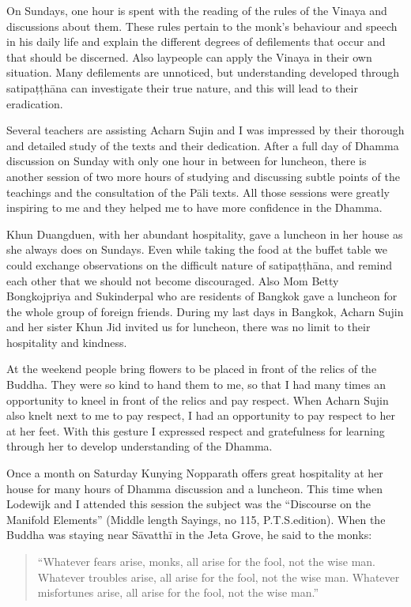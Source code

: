 On Sundays, one hour is spent with the reading of the rules of the Vinaya and discussions about them. These rules pertain to the monk’s behaviour and speech in his daily life and explain the different degrees of defilements that occur and that should be discerned. Also laypeople can apply the Vinaya in their own situation. Many defilements are unnoticed, but understanding developed through satipaṭṭhāna can investigate their true nature, and this will lead to their eradication.

Several teachers are assisting Acharn Sujin and I was impressed by their thorough and detailed study of the texts and their dedication. After a full day of Dhamma discussion on Sunday with only one hour in between for luncheon, there is another session of two more hours of studying and discussing subtle points of the teachings and the consultation of the Pāli texts. All those sessions were greatly inspiring to me and they helped me to have more confidence in the Dhamma.

Khun Duangduen, with her abundant hospitality, gave a luncheon in her house as she always does on Sundays. Even while taking the food at the buffet table we could exchange observations on the difficult nature of satipaṭṭhāna, and remind each other that we should not become discouraged. Also Mom Betty Bongkojpriya and Sukinderpal who are residents of Bangkok gave a luncheon for the whole group of foreign friends. During my last days in Bangkok, Acharn Sujin and her sister Khun Jid invited us for luncheon, there was no limit to their hospitality and kindness.

At the weekend people bring flowers to be placed in front of the relics of the Buddha. They were so kind to hand them to me, so that I had many times an opportunity to kneel in front of the relics and pay respect. When Acharn Sujin also knelt next to me to pay respect, I had an opportunity to pay respect to her at her feet. With this gesture I expressed respect and gratefulness for learning through her to develop understanding of the Dhamma.

Once a month on Saturday Kunying Nopparath offers great hospitality at her house for many hours of Dhamma discussion and a luncheon. This time when Lodewijk and I attended this session the subject was the ``Discourse on the Manifold Elements'' (Middle length Sayings, no 115, P.T.S.edition). When the Buddha was staying near Sāvatthī in the Jeta Grove, he said to the monks:

\begin{quote}
``Whatever fears arise, monks, all arise for the fool, not the wise man. Whatever troubles arise, all arise for the fool, not the wise man. Whatever misfortunes arise, all arise for the fool, not the wise man.''
\end{quote}

